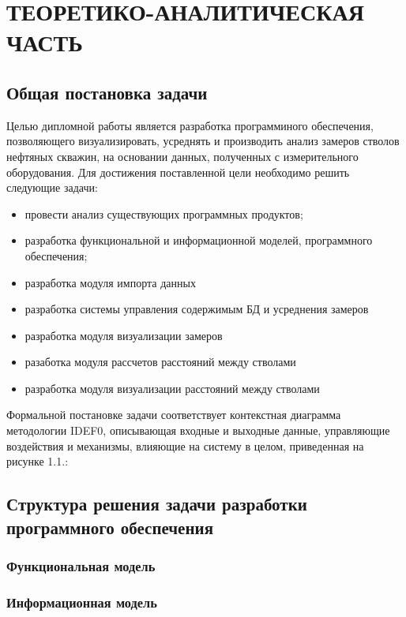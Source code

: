 \newpage
\section{ТЕОРЕТИКО-АНАЛИТИЧЕСКАЯ ЧАСТЬ}



\subsection{Общая постановка задачи}
Целью дипломной работы является разработка программиного обеспечения, позволяющего визуализировать, усреднять и производить анализ замеров стволов нефтяных скважин,
на основании данных, полученных с измерительного оборудования. Для достижения поставленной цели необходимо решить следующие задачи:
\begin{itemize}
  \item провести анализ существующих программных продуктов;
  \item разработка функциональной и информационной моделей, программного обеспечения;
  \item разработка модуля импорта данных
  \item разработка системы управления содержимым БД и усреднения замеров
  \item разработка модуля визуализации замеров
  \item разаботка модуля рассчетов расстояний между стволами
  \item разработка модуля визуализации расстояний между стволами
\end{itemize}

Формальной постановке задачи соответствует контекстная диаграмма методологии IDEF0, описывающая входные и выходные данные, управляющие воздействия и механизмы,
влияющие на систему в целом, приведенная на рисунке 1.1.:


\subsection{Структура решения задачи разработки программного обеспечения}

\subsubsection{Функциональная  модель}

\subsubsection{Информационная модель}

